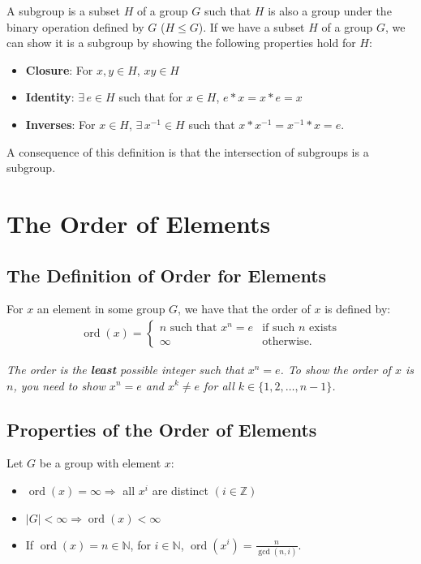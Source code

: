 \documentclass[a4paper, 12pt, twoside]{article}
\DeclareMathOperator{\Ord}{ord}
\begin{document}
A subgroup is a subset $H$ of a group $G$ such that $H$ is also a
group under the binary operation defined by $G$ ($H \leq G$). If we have a subset
$H$ of a group $G$, we can show it is a subgroup by showing the
following properties hold for $H$:

\begin{itemize}
      \item \textbf{Closure}: For $x, y \in H$, $xy \in H$
      \item \textbf{Identity}: $\exists \, e \in H$ such that
            for $x \in H$, $e * x = x * e = x$
      \item \textbf{Inverses}: For $x \in H$, $\exists \, x^{-1} \in
                  H$ such that $x * x^{-1} = x^{-1} * x = e$.
\end{itemize}

A consequence of this definition is that the intersection of subgroups
is a subgroup.

\section{The Order of Elements}

\subsection{The Definition of Order for Elements}

For $x$ an element in some group $G$, we have that the order of $x$
is defined by:
\begin{align*}
      \Ord{(x)} = \begin{cases}
            n \text{ such that } x^n = e & \text{if such $n$ exists} \\
            \infty                       & \text{otherwise.}
      \end{cases}
\end{align*}

\textit{The order is the \textbf{least} possible integer such that
      $x^n = e$. To show the order of $x$ is $n$, you need to show
      $x^n = e$ and $x^k \neq e$ for all $k \in \{1, 2, \ldots, n - 1\}$.}

\subsection{Properties of the Order of Elements}

Let $G$ be a group with element $x$:

\begin{itemize}
      \item $\Ord(x) = \infty \Rightarrow$
            all $x^i$ are distinct $(i \in \mathbb{Z})$
      \item $|G| < \infty \Rightarrow \Ord(x) < \infty$
      \item If $\Ord(x) = n \in \mathbb{N}$, for $i \in \mathbb{N}$,
            $\Ord(x^i) = \frac{n}{\gcd{(n, i)}}$.
\end{itemize}
\end{document}
